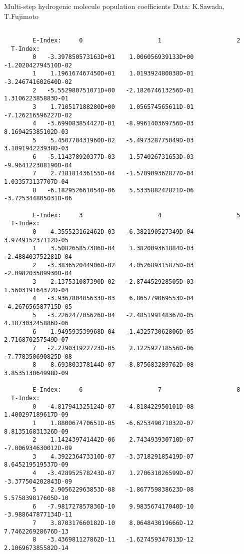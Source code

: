 \documentclass[12pt,dvipdfmx]{article}
\begin{document}
{ Multi-step hydrogenic molecule population coefficients
 Data: K.Sawada, T.Fujimoto \cite{kn:Sawada}
\begin{small}\begin{verbatim}

        E-Index:     0                     1                     2
  T-Index:
        0   -3.397850573163D+01    1.006056939133D+00   -1.202042794510D-02
        1    1.196167467450D+01    1.019392480038D-01   -3.246741602640D-02
        2   -5.552980751071D+00   -2.182674613256D-01    1.310622385883D-01
        3    1.710517188280D+00    1.056574565611D-01   -7.126216596227D-02
        4   -3.699083854427D-01   -8.996140369756D-03    8.169425385102D-03
        5    5.450770431960D-02   -5.497328775049D-03    3.109194223938D-03
        6   -5.114378920377D-03    1.574026731653D-03   -9.964122308190D-04
        7    2.718181436155D-04   -1.570909362877D-04    1.033573137707D-04
        8   -6.182952661054D-06    5.533588242821D-06   -3.725344805031D-06

        E-Index:     3                     4                     5
  T-Index:
        0    4.355523162462D-03   -6.382190527349D-04    3.974915237112D-05
        1    3.508265857386D-04    1.382009361884D-03   -2.488403752281D-04
        2   -3.383652044906D-02    4.052689315875D-03   -2.098203509930D-04
        3    2.137531087390D-02   -2.874452928505D-03    1.560319164372D-04
        4   -3.936780405633D-03    6.865779069553D-04   -4.267656587715D-05
        5   -3.226247705626D-04   -2.485199148367D-05    4.187303245886D-06
        6    1.949593539968D-04   -1.432573062806D-05    2.716870257549D-07
        7   -2.279031922723D-05    2.122592718556D-06   -7.778350690825D-08
        8    8.693803378144D-07   -8.875683289762D-08    3.853513064998D-09

        E-Index:     6                     7                     8
  T-Index:
        0   -4.817941325124D-07   -4.818422950101D-08    1.400297189617D-09
        1    1.880067470651D-05   -6.625349071032D-07    8.813516831326D-09
        2    1.142439741442D-06    2.743493930710D-07   -7.006934630012D-09
        3    4.392236473310D-07   -3.371829185419D-07    8.645219519537D-09
        4   -3.428952578243D-07    1.270631026599D-07   -3.377504202843D-09
        5    2.905622963853D-08   -1.867759838623D-08    5.575839817605D-10
        6   -7.981727857836D-10    9.983567417040D-10   -3.988647877134D-11
        7    3.870317660182D-10    8.064843019666D-12    7.746226928676D-13
        8   -3.436981127862D-11   -1.627459347813D-12    2.106967385582D-14


\end{verbatim}
\end{small}}
\end{document}
